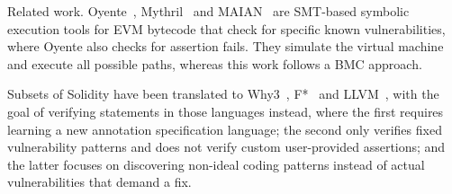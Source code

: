 \begin{paragraph}{Related work.}
Oyente~\cite{Luu2016}, Mythril~\cite{Mythril} and MAIAN~\cite{NKSSH18} are SMT-based symbolic
execution tools for EVM bytecode that check for specific known vulnerabilities,
where Oyente also checks for assertion fails. They simulate the virtual
machine and execute all possible paths, whereas this work follows a BMC approach.

Subsets of Solidity have been translated to Why3~\cite{Why3},
F*~\cite{Bhargavan2016} and LLVM~\cite{ZEUS}, with the goal of verifying
statements in those languages instead, where the first requires
learning a new annotation specification language; the second only verifies
fixed vulnerability patterns and does not verify custom user-provided
assertions; and the latter focuses on discovering non-ideal coding patterns
instead of actual vulnerabilities that demand a fix.

\end{paragraph}
